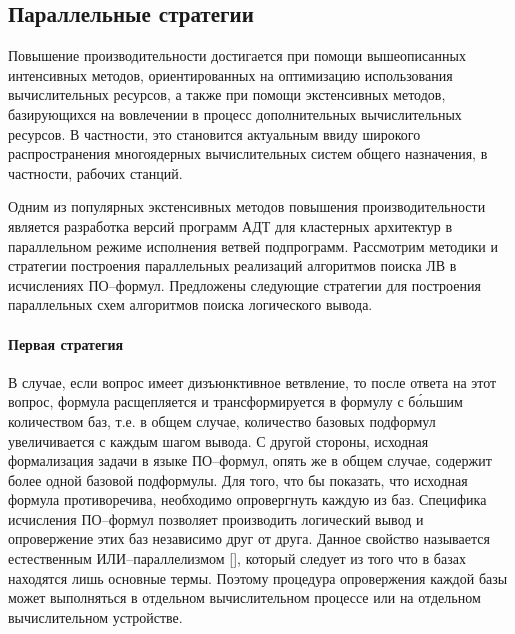 
\subsection{Параллельные стратегии}

Повышение производительности достигается при помощи вышеописанных интенсивных методов, ориентированных на оптимизацию использования вычислительных ресурсов, а также при помощи экстенсивных методов, базирующихся на вовлечении в процесс дополнительных вычислительных ресурсов. В частности, это становится актуальным ввиду широкого распространения многоядерных вычислительных систем общего назначения, в частности, рабочих станций.

Одним из популярных экстенсивных методов повышения производительности является разработка версий программ АДТ для кластерных архитектур в параллельном режиме исполнения ветвей подпрограмм. Рассмотрим методики и стратегии построения параллельных реализаций алгоритмов поиска ЛВ в исчислениях ПО--формул. Предложены следующие стратегии для построения параллельных схем алгоритмов поиска логического вывода.

\paragraph{Первая стратегия}


В случае, если вопрос имеет дизъюнктивное ветвление, то после ответа на этот вопрос, формула расщепляется и трансформируется в формулу с б\'{о}льшим количеством баз, т.е. в общем случае, количество базовых подформул увеличивается с каждым шагом вывода. С другой стороны, исходная формализация задачи в языке ПО--формул, опять же в общем случае, содержит более одной базовой подформулы. Для того, что бы показать, что исходная формула противоречива, необходимо опровергнуть каждую из баз. Специфика исчисления ПО--формул позволяет производить логический вывод и опровержение этих баз независимо друг от друга. Данное свойство называется естественным ИЛИ--параллелизмом [], который следует из того что в базах находятся лишь основные термы. Поэтому процедура опровержения каждой базы может выполняться в отдельном вычислительном процессе или на отдельном вычислительном устройстве.

